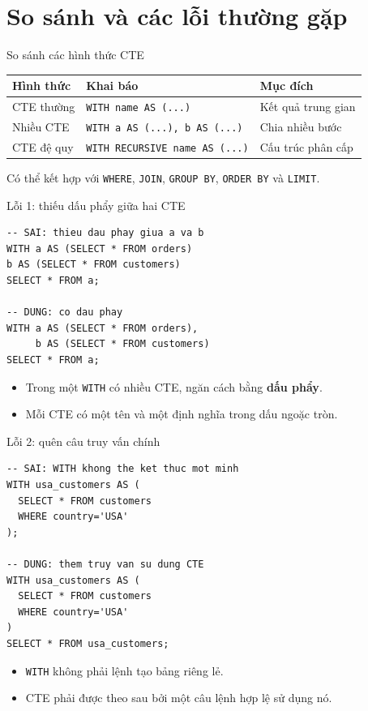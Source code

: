 \documentclass[aspectratio=169,10pt]{beamer}
\newcommand{\code}[1]{\texttt{#1}}
\begin{document}
\section{So sánh và các lỗi thường gặp}

\begin{frame}[fragile]{So sánh các hình thức CTE}
\small
\begin{center}
\begin{tabular}{l l p{3.4cm}}
\toprule
Hình thức & Khai báo & Mục đích \\
\midrule
CTE thường & \code{WITH name AS (...)} & Kết quả trung gian \\
Nhiều CTE & \code{WITH a AS (...), b AS (...)} & Chia nhiều bước \\
CTE đệ quy & \code{WITH RECURSIVE name AS (...)} & Cấu trúc phân cấp \\
\bottomrule
\end{tabular}
\end{center}
\vspace{.25em}
\small Có thể kết hợp với \code{WHERE}, \code{JOIN}, \code{GROUP BY}, \code{ORDER BY} và \code{LIMIT}.
\end{frame}

\begin{frame}[fragile]{Lỗi 1: thiếu dấu phẩy giữa hai CTE}
\small
\begin{lstlisting}[basicstyle=\ttfamily\scriptsize]
-- SAI: thieu dau phay giua a va b
WITH a AS (SELECT * FROM orders)
b AS (SELECT * FROM customers)
SELECT * FROM a;

-- DUNG: co dau phay
WITH a AS (SELECT * FROM orders),
     b AS (SELECT * FROM customers)
SELECT * FROM a;
\end{lstlisting}
\vspace{.1em}
\begin{itemize}
\item Trong một \code{WITH} có nhiều CTE, ngăn cách bằng \textbf{dấu phẩy}.
\item Mỗi CTE có một tên và một định nghĩa trong dấu ngoặc tròn.
\end{itemize}
\end{frame}

\begin{frame}[fragile]{Lỗi 2: quên câu truy vấn chính}
\small
\begin{lstlisting}[basicstyle=\ttfamily\scriptsize]
-- SAI: WITH khong the ket thuc mot minh
WITH usa_customers AS (
  SELECT * FROM customers
  WHERE country='USA'
);

-- DUNG: them truy van su dung CTE
WITH usa_customers AS (
  SELECT * FROM customers
  WHERE country='USA'
)
SELECT * FROM usa_customers;
\end{lstlisting}
\vspace{.1em}
\begin{itemize}
\item \code{WITH} không phải lệnh tạo bảng riêng lẻ.
\item CTE phải được theo sau bởi một câu lệnh hợp lệ sử dụng nó.
\end{itemize}
\end{frame}
\end{document}
